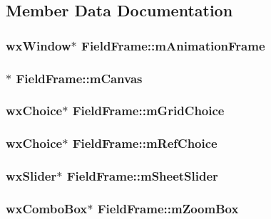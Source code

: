 \subsection{Member Data Documentation}
\hypertarget{a00102_ab9bcb01889e459911b8b9addc79973ac}{
\subsubsection[{m\-Animation\-Frame}]{\setlength{\rightskip}{0pt plus 5cm}wx\-Window$\ast$ Field\-Frame\-::m\-Animation\-Frame}}\label{a00102_ab9bcb01889e459911b8b9addc79973ac}
\hypertarget{a00102_acf445173b0e0e1f281453d8ee4003061}{
\subsubsection[{m\-Canvas}]{$\ast$ Field\-Frame\-::m\-Canvas}}\label{a00102_acf445173b0e0e1f281453d8ee4003061}
\hypertarget{a00102_a9d711f7509d3ca3f3643b2e4b91a4078}{
\subsubsection[{m\-Grid\-Choice}]{\setlength{\rightskip}{0pt plus 5cm}wx\-Choice$\ast$ Field\-Frame\-::m\-Grid\-Choice}}\label{a00102_a9d711f7509d3ca3f3643b2e4b91a4078}
\hypertarget{a00102_ac48d3e2da0c073ddb794194ef3658c08}{
\subsubsection[{m\-Ref\-Choice}]{\setlength{\rightskip}{0pt plus 5cm}wx\-Choice$\ast$ Field\-Frame\-::m\-Ref\-Choice}}\label{a00102_ac48d3e2da0c073ddb794194ef3658c08}
\hypertarget{a00102_ac29f4a72ca3b9c1ecd7eab863aff0f71}{
\subsubsection[{m\-Sheet\-Slider}]{\setlength{\rightskip}{0pt plus 5cm}wx\-Slider$\ast$ Field\-Frame\-::m\-Sheet\-Slider}}\label{a00102_ac29f4a72ca3b9c1ecd7eab863aff0f71}
\hypertarget{a00102_afc1d8687635d0634742edfc1289ddb2a}{
\subsubsection[{m\-Zoom\-Box}]{\setlength{\rightskip}{0pt plus 5cm}wx\-Combo\-Box$\ast$ Field\-Frame\-::m\-Zoom\-Box}}\label{a00102_afc1d8687635d0634742edfc1289ddb2a}


